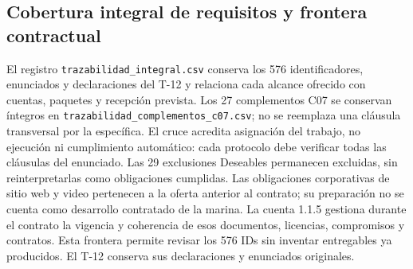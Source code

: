 \subsection{Cobertura integral de requisitos y frontera contractual}
El registro \texttt{trazabilidad\_integral.csv} conserva los 576 identificadores, enunciados y declaraciones del T-12 y relaciona cada alcance ofrecido con cuentas, paquetes y recepción prevista. Los 27 complementos C07 se conservan íntegros en \texttt{trazabilidad\_complementos\_c07.csv}; no se reemplaza una cláusula transversal por la específica. El cruce acredita asignación del trabajo, no ejecución ni cumplimiento automático: cada protocolo debe verificar todas las cláusulas del enunciado. Las 29 exclusiones Deseables permanecen excluidas, sin reinterpretarlas como obligaciones cumplidas.
Las obligaciones corporativas de sitio web y video pertenecen a la oferta anterior al contrato; su preparación no se cuenta como desarrollo contratado de la marina. La cuenta 1.1.5 gestiona durante el contrato la vigencia y coherencia de esos documentos, licencias, compromisos y contratos. Esta frontera permite revisar los 576 IDs sin inventar entregables ya producidos. El T-12 conserva sus declaraciones y enunciados originales.
